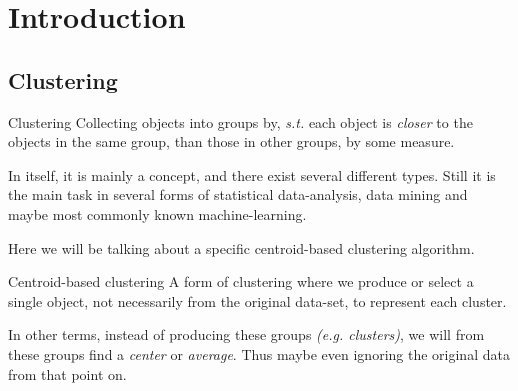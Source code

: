 \documentclass{beamer}
\begin{document}
\frame{\titlepage}

\section{Introduction}
\subsection{Clustering}

\begin{frame}
  \begin{block}{Clustering}
    Collecting objects into groups by, \textit{s.t.} each object is \textit{closer}
    to the objects in the same group, than those in other groups, by some measure.
  \end{block}

  In itself, it is mainly a concept, and there exist several different types. Still
  it is the main task in several forms of statistical data-analysis, data mining and
  maybe most commonly known machine-learning.

  Here we will be talking about a specific \alert{centroid-based clustering} algorithm.
\end{frame}

\begin{frame}
  \begin{block}{Centroid-based clustering}
    A form of clustering where we produce or select a single object, not necessarily
    from the original data-set, to represent each cluster.
  \end{block}

  In other terms, instead of producing these groups \textit{(e.g. clusters)}, we will
  from these groups find a \textit{center} or \textit{average}. Thus maybe even
  ignoring the original data from that point on.
\end{frame}
\end{document}
